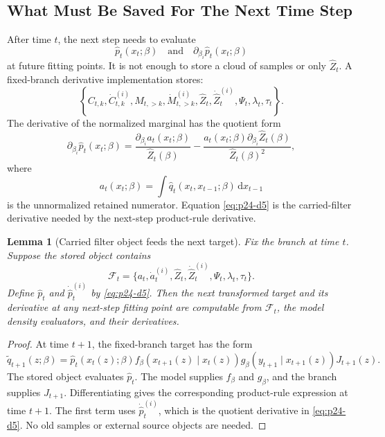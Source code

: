 \documentclass[11pt]{article}
\newtheorem{lemma}{Lemma}
\numberwithin{equation}{section}
\newcommand{\dd}{\,\mathrm d}
\begin{document}
\subsection{What Must Be Saved For The Next Time Step}

After time \(t\), the next step needs to evaluate
\[
    \widehat p_t(x_t;\beta)
    \quad\text{and}\quad
    \partial_{\beta_i}\widehat p_t(x_t;\beta)
\]
at future fitting points.  It is not enough to store a cloud of samples or only
\(\widehat Z_t\).  A fixed-branch derivative implementation stores:
\begin{equation}
    \left\{
    C_{t,k},\dot C_{t,k}^{(i)},M_{t,>k},\dot M_{t,>k}^{(i)},
    \widehat Z_t,\dot{\widehat Z}_t^{(i)},
    \Psi_t,\lambda_t,\tau_t
    \right\}.
    \label{eq:p24-d4}
\end{equation}
The derivative of the normalized marginal has the quotient form
\begin{equation}
    \partial_{\beta_i}\widehat p_t(x_t;\beta)
    =
    \frac{\partial_{\beta_i}a_t(x_t;\beta)}{\widehat Z_t(\beta)}
    -
    \frac{a_t(x_t;\beta)\partial_{\beta_i}\widehat Z_t(\beta)}
    {\widehat Z_t(\beta)^2},
    \label{eq:p24-d5}
\end{equation}
where
\begin{equation}
    a_t(x_t;\beta)
    =
    \int \widehat q_t(x_t,x_{t-1};\beta)\dd x_{t-1}
    \label{eq:p24-d6}
\end{equation}
is the unnormalized retained numerator.  Equation \eqref{eq:p24-d5} is the carried-filter
derivative needed by the next-step product-rule derivative.

\begin{lemma}[Carried filter object feeds the next target]
Fix the branch at time \(t\).  Suppose the stored object contains
\[
    \mathcal F_t
    =
    \{a_t,\dot a_t^{(i)},\widehat Z_t,\dot{\widehat Z}_t^{(i)},
      \Psi_t,\lambda_t,\tau_t\}.
\]
Define \(\widehat p_t\) and \(\dot{\widehat p}_t^{(i)}\) by \eqref{eq:p24-d5}.  Then the
next transformed target and its derivative at any next-step fitting point are
computable from \(\mathcal F_t\), the model density evaluators, and their
derivatives.
\end{lemma}

\begin{proof}
At time \(t+1\), the fixed-branch target has the form
\[
    \widetilde q_{t+1}(z;\beta)
    =
    \widehat p_t(x_t(z);\beta)
    f_\beta(x_{t+1}(z)\mid x_t(z))
    g_\beta(y_{t+1}\mid x_{t+1}(z))
    J_{t+1}(z).
\]
The stored object evaluates \(\widehat p_t\).  The model supplies \(f_\beta\)
and \(g_\beta\), and the branch supplies \(J_{t+1}\).  Differentiating gives
the corresponding product-rule expression at time \(t+1\).  The first
term uses \(\dot{\widehat p}_t^{(i)}\), which is the quotient derivative in
\eqref{eq:p24-d5}.  No old samples or external source objects are needed.
\end{proof}
\end{document}
